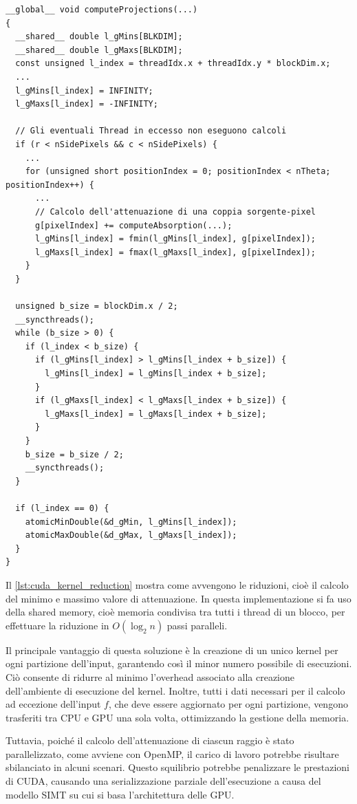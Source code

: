 \documentclass[12pt,a4paper]{report}
\begin{document}
\begin{lstlisting}[language=CStyle, caption={Codice CUDA-C per effettuare la riduzione nel kernel.}, label={lst:cuda_kernel_reduction}]
__global__ void computeProjections(...)
{
  __shared__ double l_gMins[BLKDIM];
  __shared__ double l_gMaxs[BLKDIM];
  const unsigned l_index = threadIdx.x + threadIdx.y * blockDim.x;
  ...
  l_gMins[l_index] = INFINITY;
  l_gMaxs[l_index] = -INFINITY;

  // Gli eventuali Thread in eccesso non eseguono calcoli
  if (r < nSidePixels && c < nSidePixels) {
    ...
    for (unsigned short positionIndex = 0; positionIndex < nTheta; positionIndex++) {
      ...
      // Calcolo dell'attenuazione di una coppia sorgente-pixel
      g[pixelIndex] += computeAbsorption(...);
      l_gMins[l_index] = fmin(l_gMins[l_index], g[pixelIndex]);
      l_gMaxs[l_index] = fmax(l_gMaxs[l_index], g[pixelIndex]);
    }
  }

  unsigned b_size = blockDim.x / 2;
  __syncthreads();
  while (b_size > 0) {
    if (l_index < b_size) {
      if (l_gMins[l_index] > l_gMins[l_index + b_size]) {
        l_gMins[l_index] = l_gMins[l_index + b_size];
      }
      if (l_gMaxs[l_index] < l_gMaxs[l_index + b_size]) {
        l_gMaxs[l_index] = l_gMaxs[l_index + b_size];
      }
    }
    b_size = b_size / 2;
    __syncthreads();
  }

  if (l_index == 0) {
    atomicMinDouble(&d_gMin, l_gMins[l_index]);
    atomicMaxDouble(&d_gMax, l_gMaxs[l_index]);
  }
}
\end{lstlisting}

Il \autoref{lst:cuda_kernel_reduction} mostra come avvengono le riduzioni, cioè il calcolo del minimo e massimo valore di
attenuazione.
In questa implementazione si fa uso della shared memory, cioè memoria condivisa tra tutti i thread di un blocco, per effettuare la
riduzione in \(O(\log_2 n)\) passi paralleli.

Il principale vantaggio di questa soluzione è la creazione di un unico kernel per ogni partizione dell'input, garantendo così il
minor numero possibile di esecuzioni.
Ciò consente di ridurre al minimo l'overhead associato alla creazione dell'ambiente di esecuzione del kernel.
Inoltre, tutti i dati necessari per il calcolo ad eccezione dell'input \(f\), che deve essere aggiornato per ogni partizione,
vengono trasferiti tra CPU e GPU una sola volta, ottimizzando la gestione della memoria.

Tuttavia, poiché il calcolo dell'attenuazione di ciascun raggio è stato parallelizzato, come avviene con OpenMP, il carico di
lavoro potrebbe risultare sbilanciato in alcuni scenari.
Questo squilibrio potrebbe penalizzare le prestazioni di CUDA, causando una serializzazione parziale dell'esecuzione a causa del
modello SIMT su cui si basa l'architettura delle GPU.
\end{document}
